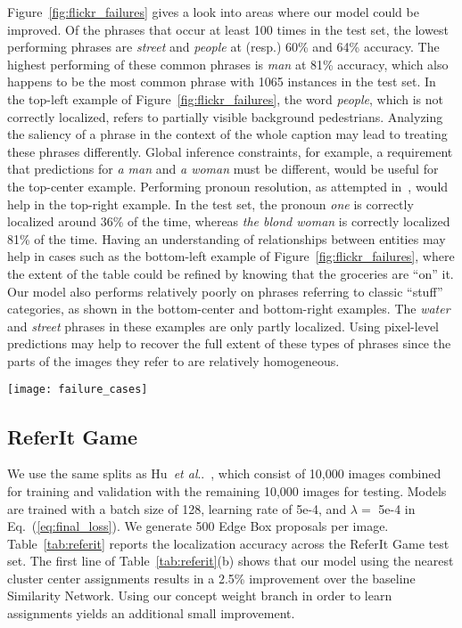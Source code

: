 \documentclass[runningheads]{llncs}
\makeatletter
\DeclareRobustCommand\onedot{\futurelet\@let@token\@onedot}
\def\@onedot{\ifx\@let@token.\else.\null\fi\xspace}
\def\etal{\emph{et al}\onedot}
\makeatother
\begin{document}
\begin{table*}[t]
\end{table*} Figure~\ref{fig:flickr_failures} gives a look into areas where our model could be improved.  Of the phrases that occur at least 100 times in the test set, the lowest performing phrases are \emph{street} and \emph{people} at (resp.) 60\% and 64\% accuracy.  The highest performing of these common phrases is \emph{man} at 81\% accuracy, which also happens to be the most common phrase with 1065 instances in the test set.  In the top-left example of Figure~\ref{fig:flickr_failures}, the word {\em people}, which is not correctly localized, refers to partially visible background pedestrians.  Analyzing the saliency of a phrase in the context of the whole caption may lead to treating these phrases differently. Global inference constraints, for example, a requirement that predictions for {\em a man} and {\em a woman} must be different, would be useful for the top-center example.  Performing pronoun resolution, as attempted in~\cite{plummerPLCLC2017}, would help in the top-right example.  In the test set, the pronoun \emph{one} is correctly localized around 36\% of the time, whereas \emph{the blond woman} is correctly localized 81\% of the time.  Having an understanding of relationships between entities may help in cases such as the bottom-left example of Figure~\ref{fig:flickr_failures}, where the extent of the table could be refined by knowing that the groceries are ``on'' it.  Our model also performs relatively poorly on phrases referring to classic ``stuff'' categories, as shown in the bottom-center and bottom-right examples.  The {\em water} and {\em street} phrases in these examples are only partly localized.  Using pixel-level predictions may help to recover the full extent of these types of phrases since the parts of the images they refer to are relatively homogeneous.

\begin{figure*}[t]
\centering
\texttt{[image: failure\_cases]}
\caption{Examples demonstrating some common failure cases on the Flickr30K Entities dataset.  See Section~\ref{sec:flickr} for discussion}
\label{fig:flickr_failures}
\end{figure*}\subsection{ReferIt Game}
We use the same splits as Hu~\etal~\cite{hu2015natural}, which consist of 10,000  images combined for training and validation with the remaining 10,000 images for testing.  Models are trained with a batch size of 128, learning rate of 5e-4, and $\lambda =$ 5e-4 in Eq.~(\ref{eq:final_loss}).  We generate 500 Edge Box proposals per image.
\smallskip{} Table~\ref{tab:referit} reports the localization accuracy across the ReferIt Game test set. The first line of Table~\ref{tab:referit}(b) shows that our model using the nearest cluster center assignments results in a 2.5\% improvement over the baseline Similarity Network.  Using our concept weight branch in order to learn assignments yields an additional small improvement.
\end{document}
